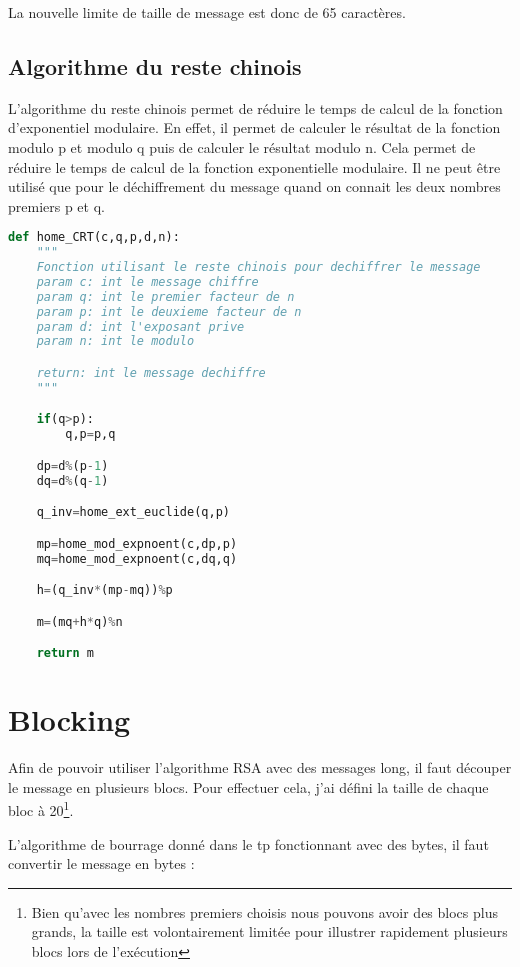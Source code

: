 \documentclass[12pt]{article}
\begin{document}
La nouvelle limite de taille de message est donc de 65 caractères.

\subsection{Algorithme du reste chinois}

L'algorithme du reste chinois permet de réduire le temps de calcul de la fonction d'exponentiel modulaire. En effet, il permet de calculer le résultat de la fonction modulo p et modulo q puis de calculer le résultat modulo n. Cela permet de réduire le temps de calcul de la fonction exponentielle modulaire.
Il ne peut être utilisé que pour le déchiffrement du message quand on connait les deux nombres premiers p et q.

\begin{lstlisting}[language=python]
    def home_CRT(c,q,p,d,n):
    """
    Fonction utilisant le reste chinois pour dechiffrer le message
    param c: int le message chiffre
    param q: int le premier facteur de n
    param p: int le deuxieme facteur de n
    param d: int l'exposant prive
    param n: int le modulo

    return: int le message dechiffre
    """

    if(q>p):
        q,p=p,q

    dp=d%(p-1)
    dq=d%(q-1)

    q_inv=home_ext_euclide(q,p)

    mp=home_mod_expnoent(c,dp,p)
    mq=home_mod_expnoent(c,dq,q)

    h=(q_inv*(mp-mq))%p

    m=(mq+h*q)%n

    return m
\end{lstlisting}

\section{Blocking}

Afin de pouvoir utiliser l'algorithme RSA avec des messages long, il faut découper le message en plusieurs blocs.
Pour effectuer cela, j'ai défini la taille de chaque bloc à 20\footnote{Bien qu'avec les nombres premiers choisis nous pouvons avoir des blocs plus grands, la taille est volontairement limitée pour illustrer rapidement plusieurs blocs lors de l'exécution}.

L'algorithme de bourrage donné dans le tp fonctionnant avec des bytes, il faut convertir le message en bytes :
\end{document}
